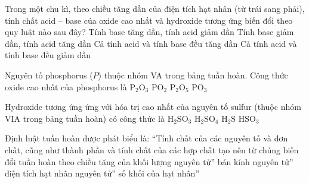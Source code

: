 \begin{ex}
    Trong một chu kì, theo chiều tăng dần của điện tích hạt nhân (từ trái sang phải), tính chất acid -- base của oxide cao nhất và hydroxide tương ứng biến đổi theo quy luật nào sau đây?
    \choice
    {Tính base tăng dần, tính acid giảm dần}
    {\True Tính base giảm dần, tính acid tăng dần}
    {Cả tính acid và tính base đều tăng dần}
    {Cả tính acid và tính base đều giảm dần}
\end{ex}

\begin{ex}
    Nguyên tố phosphorus ($P$) thuộc nhóm VA trong bảng tuần hoàn. Công thức oxide cao nhất của phosphorus là
    \choice
    {$\text{P}_2\text{O}_3$}
    {$\text{PO}_2$}
    {\True $\text{P}_2\text{O}_5$}
    {$\text{PO}_3$}
\end{ex}

\begin{ex}
    Hydroxide tương ứng ứng với hóa trị cao nhất của nguyên tố sulfur (thuộc nhóm VIA trong bảng tuần hoàn) có công thức là
    \choice
    {$\text{H}_2\text{SO}_3$}
    {\True $\text{H}_2\text{SO}_4$}
    {$\text{H}_2\text{S}$}
    {$\text{HSO}_3$}
\end{ex}

\begin{ex}
    Định luật tuần hoàn được phát biểu là: ``Tính chất của các nguyên tố và đơn chất, cũng như thành phần và tính chất của các hợp chất tạo nên từ chúng biến đổi tuần hoàn theo chiều tăng của
    \choice
    {khối lượng nguyên tử''}
    {bán kính nguyên tử''}
    {\True điện tích hạt nhân nguyên tử''}
    {số khối của hạt nhân''}
\end{ex}

